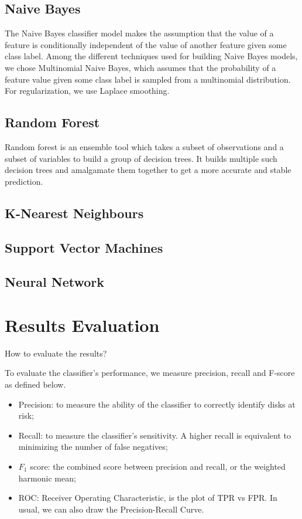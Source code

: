 \documentclass[12pt,a4paper,english]{amsart}
\begin{document}
\subsection*{Naive Bayes}

The Naive Bayes classifier model makes the assumption that the value of a feature is conditionally independent of the value of another feature given some class label. Among the different techniques used for building Naive Bayes models, we chose Multinomial Naive Bayes, which assumes that the probability of a feature value given some class label   is   sampled   from   a   multinomial   distribution.   For   regularization,   we   use   Laplace   smoothing.

\subsection*{Random Forest}

Random forest is an ensemble tool which takes a subset of observations and a subset of variables to build a group of decision trees. It builds multiple such decision trees and amalgamate them together to get a more accurate and stable prediction.

\subsection*{K-Nearest Neighbours}

\subsection*{Support Vector Machines}

\subsection*{Neural Network}

%
\section{Results Evaluation}

How to evaluate the results?

To evaluate the classifier's performance, we measure precision, recall and F-score as defined below.
\begin{itemize}
	\item Precision: to measure the ability of the classifier to correctly identify disks at risk;
	\item Recall: to measure the classifier's sensitivity. A higher recall is equivalent to minimizing the number of false negatives;
	\item $F_1$ score: the combined score between precision and recall, or the weighted harmonic mean;
	\item ROC: Receiver Operating Characteristic, is the plot of TPR vs FPR. In usual, we can also draw the Precision-Recall Curve.
\end{itemize}
\end{document}
